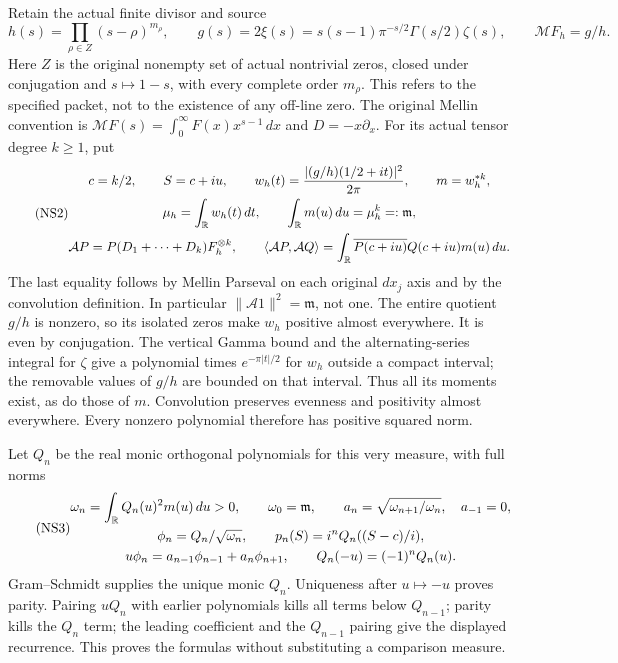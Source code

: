 \documentclass[11pt]{article}
\begin{document}
Retain the actual finite divisor and source
\begin{equation}\tag{NS1}\label{sfsec:NS1}
h(s)=\prod_{\rho\in Z}(s-\rho)^{m_\rho},\qquad
g(s)=2\xi(s)=s(s-1)\pi^{-s/2}\Gamma(s/2)\zeta(s),\qquad
\mathcal M F_h=g/h.
\end{equation}
Here $Z$ is the original nonempty set of actual nontrivial zeros,
closed under conjugation and $s\mapsto1-s$, with every complete
order $m_\rho$. This refers to the specified packet, not to the
existence of any off-line zero. The original Mellin convention is
$\mathcal M F(s)=\int_0^\infty F(x)x^{s-1}\,dx$ and $D=-x\partial_x$.
For its actual tensor degree $k\geq1$, put
\begin{equation}\tag{NS2}\label{sfsec:NS2}
\begin{gathered}
c=k/2,\qquad S=c+iu,\qquad
w_h(t)=\frac{|(g/h)(1/2+it)|^2}{2\pi},\qquad m=w_h^{*k},\\
\mu_h=\int_\mathbb R w_h(t)\,dt,\qquad
\int_\mathbb R m(u)\,du=\mu_h^k=:\mathfrak m,\\
\mathcal A P=P(D_1+\cdots+D_k)F_h^{\otimes k},\qquad
\langle\mathcal A P,\mathcal A Q\rangle
 =\int_\mathbb R\overline{P(c+iu)}Q(c+iu)m(u)\,du .
\end{gathered}
\end{equation}
The last equality follows by Mellin Parseval on each original
$dx_j$ axis and by the convolution definition. In particular
$\|\mathcal A1\|^2=\mathfrak m$, not one.
The entire quotient $g/h$ is nonzero, so its isolated zeros make
$w_h$ positive almost everywhere. It is even by conjugation.
The vertical Gamma bound and the alternating-series integral for
$\zeta$ give a polynomial times $e^{-\pi|t|/2}$ for $w_h$ outside
a compact interval; the removable values of $g/h$ are bounded on
that interval. Thus all its moments exist, as do those of $m$.
Convolution preserves evenness and positivity almost everywhere.
Every nonzero polynomial therefore has positive squared norm.

Let $Q_n$ be the real monic orthogonal polynomials for this very
measure, with full norms
\begin{equation}\tag{NS3}\label{sfsec:NS3}
\begin{gathered}
\omega_n=\int_\mathbb R Q_n(u)^2m(u)\,du>0,\qquad
\omega_0=\mathfrak m,\qquad a_n=\sqrt{\omega_{n+1}/\omega_n},
\quad a_{-1}=0,\\
\phi_n=Q_n/\sqrt{\omega_n},\qquad
p_n(S)=i^nQ_n((S-c)/i),\\
u\phi_n=a_{n-1}\phi_{n-1}+a_n\phi_{n+1},
\qquad Q_n(-u)=(-1)^nQ_n(u).
\end{gathered}
\end{equation}
Gram--Schmidt supplies the unique monic $Q_n$. Uniqueness after
$u\mapsto-u$ proves parity. Pairing $uQ_n$ with earlier
polynomials kills all terms below $Q_{n-1}$; parity kills the
$Q_n$ term; the leading coefficient and the $Q_{n-1}$ pairing
give the displayed recurrence. This proves the formulas without
substituting a comparison measure.
\end{document}
